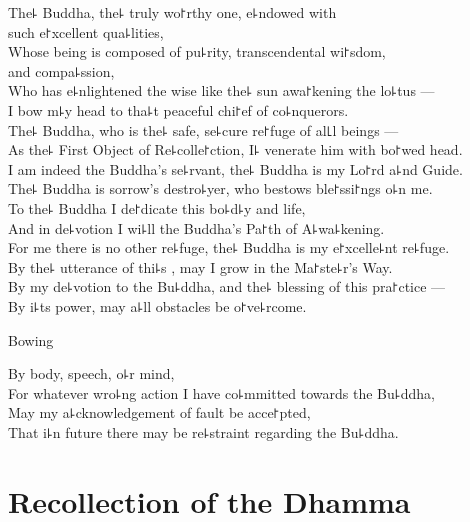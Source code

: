 The꜕ Buddha, the꜕ truly wo꜓rthy one, e꜕ndowed with\\
\vin such e꜓xcellent qua꜕lities,\\
Whose being is composed of pu꜕rity, transcendental wi꜓sdom,\\
\vin and compa꜕ssion,\\
Who has e꜕nlightened the wise like the꜕ sun awa꜓kening the lo꜕tus ---\\
I bow m꜕y head to tha꜕t peaceful chi꜓ef of co꜕nquerors.\\
The꜕ Buddha, who is the꜕ safe, se꜕cure re꜓fuge of al꜖l beings ---\\
As the꜕ First Object of Re꜕colle꜓ction, I꜕ venerate him with bo꜓wed head.\\
I am indeed the Buddha's se꜕rvant, the꜕ Buddha is my Lo꜓rd a꜕nd Guide.\\
The꜕ Buddha is sorrow's destro꜕yer, who bestows ble꜓ssi꜓ngs o꜕n me.\\
To the꜕ Buddha I de꜓dicate this bo꜕d꜕y and life,\\
And in de꜕votion I wi꜕ll  the Buddha's Pa꜓th of A꜕wa꜕kening.\\
For me there is no other re꜕fuge, the꜕ Buddha is my e꜓xcelle꜕nt re꜕fuge.\\
By the꜕ utterance of thi꜕s , may I grow in the Ma꜓ste꜕r's Way.\\
By my de꜕votion to the Bu꜕ddha, and the꜕ blessing of this pra꜓ctice ---\\
By i꜕ts power, may a꜕ll obstacles be o꜓ve꜕rcome.

\begin{instruction}
  Bowing
\end{instruction}

By body, speech, o꜕r mind,\\
For whatever wro꜕ng action I have co꜕mmitted towards the Bu꜕ddha,\\
May my a꜕cknowledgement of fault be acce꜓pted,\\
That i꜕n future there may be re꜕straint regarding the Bu꜕ddha.

\clearpage

\chapter*{Recollection of the Dhamma}

\delegateSetUseNext

\begin{leader}
\end{leader}

